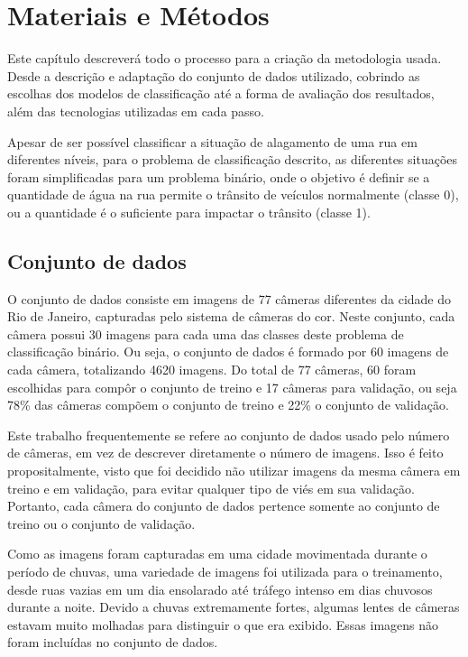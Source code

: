 \chapter{Materiais e Métodos}\label{cap:metodologia}

Este capítulo descreverá todo o processo para a criação da metodologia usada. 
Desde a descrição e adaptação do conjunto de dados utilizado, cobrindo as escolhas dos modelos de classificação até a forma de avaliação dos resultados, 
além das tecnologias utilizadas em cada passo.

Apesar de ser possível classificar a situação de alagamento de uma rua em diferentes níveis, para o problema de classificação descrito, 
as diferentes situações foram simplificadas para um problema binário, onde o objetivo é definir se a quantidade de água na rua permite o trânsito de veículos normalmente (classe 0), 
ou a quantidade é o suficiente para impactar o trânsito (classe 1).

\section{Conjunto de dados}\label{sec:dataset}

O conjunto de dados consiste em imagens de 77 câmeras diferentes da cidade do Rio de Janeiro, capturadas pelo sistema de câmeras do \Acrfull{cor}. 
Neste conjunto, cada câmera possui 30 imagens para cada uma das classes deste problema de classificação binário. 
Ou seja, o conjunto de dados é formado por 60 imagens de cada câmera, totalizando 4620 imagens. 
Do total de 77 câmeras, 60 foram escolhidas para compôr o conjunto de treino e 17 câmeras para validação, ou seja 78\% das câmeras compõem o conjunto de treino e 22\% o conjunto de validação.

Este trabalho frequentemente se refere ao conjunto de dados usado pelo número de câmeras, em vez de descrever diretamente o número de imagens.
Isso é feito propositalmente, visto que foi decidido não utilizar imagens da mesma câmera em treino e em validação, para evitar qualquer tipo de viés em sua validação.
Portanto, cada câmera do conjunto de dados pertence somente ao conjunto de treino ou o conjunto de validação.

Como as imagens foram capturadas em uma cidade movimentada durante o período de chuvas, uma variedade de imagens foi utilizada para o treinamento, 
desde ruas vazias em um dia ensolarado até tráfego intenso em dias chuvosos durante a noite.
Devido a chuvas extremamente fortes, algumas lentes de câmeras estavam muito molhadas para distinguir o que era exibido. Essas imagens não foram incluídas no conjunto de dados.

